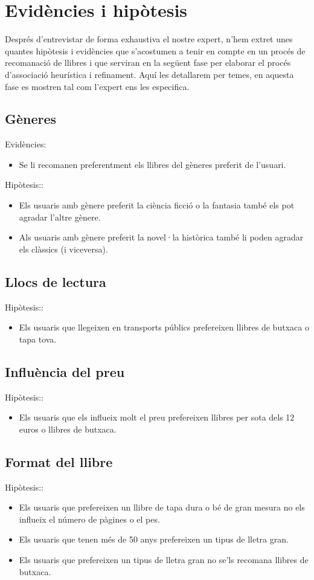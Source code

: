 \section{Evidències i hipòtesis}

Després d'entrevistar de forma exhaustiva el nostre expert, n'hem extret unes quantes hipòtesis i evidències que s'acostumen a tenir en compte en un procés de recomanació de llibres i que serviran en la següent fase per elaborar el procés d'associació heurística i refinament. Aquí les detallarem per temes, en aquesta fase es mostren tal com l'expert ens les especifica.

\subsection{Gèneres}
Evidències:
\begin{itemize}
  \item Se li recomanen preferentment els llibres del gèneres preferit de l'usuari.
\end{itemize}
Hipòtesis::
\begin{itemize}
  \item Els usuaris amb gènere preferit la ciència ficció o la fantasia també els pot agradar l'altre gènere.
  \item Als usuaris amb gènere preferit la novel·la històrica també li poden agradar els clàssics (i viceversa).
\end{itemize}

\subsection{Llocs de lectura}
Hipòtesis::
\begin{itemize}
  \item Els usuaris que llegeixen en transports públics prefereixen llibres de butxaca o tapa tova.
\end{itemize}

\subsection{Influència del preu}
Hipòtesis::
\begin{itemize}
  \item Els usuaris que els influeix molt el preu prefereixen llibres per sota dels 12 euros o llibres de butxaca.
\end{itemize}

\subsection{Format del llibre}
Hipòtesis::
\begin{itemize}
  \item Els usuaris que prefereixen un llibre de tapa dura o bé de gran mesura no els influeix el número de pàgines o el pes.
  \item Els usuaris que tenen més de 50 anys prefereixen un tipus de lletra gran.
  \item Els usuaris que prefereixen un tipus de lletra gran no se'ls recomana llibres de butxaca.
\end{itemize}

